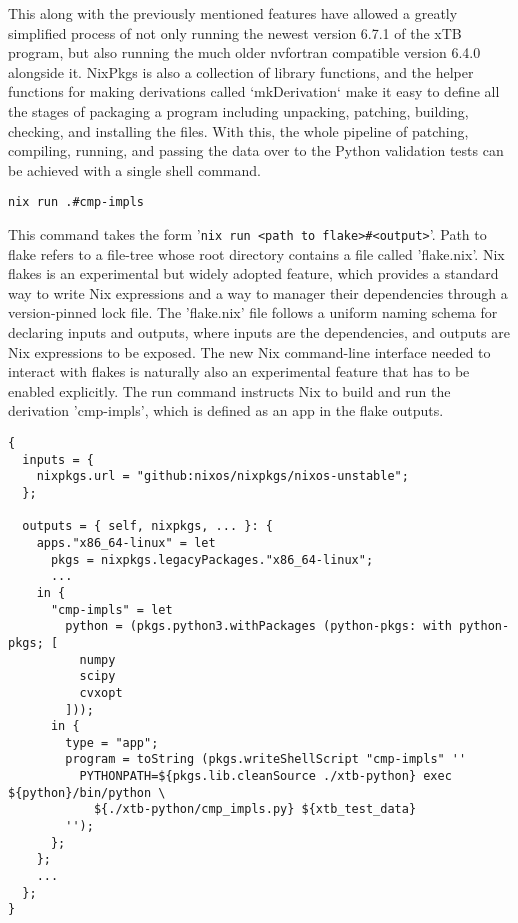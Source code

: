 This along with the previously mentioned features have allowed a greatly simplified process of not only running the newest version 6.7.1 of the xTB program, but also running the much older nvfortran compatible version 6.4.0 alongside it.
NixPkgs is also a collection of library functions, and the helper functions for making derivations called `mkDerivation` make it easy to define all the stages of packaging a program including unpacking, patching, building, checking, and installing the files.
With this, the whole pipeline of patching, compiling, running, and passing the data over to the Python validation tests can be achieved with a single shell command.

\begin{verbatim}
nix run .#cmp-impls
\end{verbatim}


This command takes the form '\verb|nix run <path to flake>#<output>|'. Path to flake refers to a file-tree whose root directory contains a file called 'flake.nix'. Nix flakes is an experimental but widely adopted feature, which provides a standard way to write Nix expressions and a way to manager their dependencies through a version-pinned lock file. The 'flake.nix' file follows a uniform naming schema for declaring inputs and outputs, where inputs are the dependencies, and outputs are Nix expressions to be exposed.
The new Nix command-line interface needed to interact with flakes is naturally also an experimental feature that has to be enabled explicitly. The run command instructs Nix to build and run the derivation 'cmp-impls', which is defined as an app in the flake outputs.

\newpage

\begin{verbatim}
{
  inputs = {
    nixpkgs.url = "github:nixos/nixpkgs/nixos-unstable";
  };

  outputs = { self, nixpkgs, ... }: {
    apps."x86_64-linux" = let
      pkgs = nixpkgs.legacyPackages."x86_64-linux";
      ...
    in {
      "cmp-impls" = let
        python = (pkgs.python3.withPackages (python-pkgs: with python-pkgs; [
          numpy
          scipy
          cvxopt
        ]));
      in {
        type = "app";
        program = toString (pkgs.writeShellScript "cmp-impls" ''
          PYTHONPATH=${pkgs.lib.cleanSource ./xtb-python} exec ${python}/bin/python \
            ${./xtb-python/cmp_impls.py} ${xtb_test_data}
        '');
      };
    };
    ...
  };
}
\end{verbatim}

